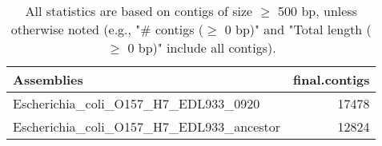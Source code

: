 \documentclass[12pt,a4paper]{article}
\begin{document}
\begin{table}[ht]
\begin{center}
\caption{All statistics are based on contigs of size $\geq$ 500 bp, unless otherwise noted (e.g., "\# contigs ($\geq$ 0 bp)" and "Total length ($\geq$ 0 bp)" include all contigs).}
\begin{tabular}{|l*{1}{|r}|}
\hline
Assemblies & final.contigs \\ \hline
Escherichia\_coli\_O157\_H7\_EDL933\_0920 & 17478 \\ \hline
Escherichia\_coli\_O157\_H7\_EDL933\_ancestor & 12824 \\ \hline
\end{tabular}
\end{center}
\end{table}
\end{document}
